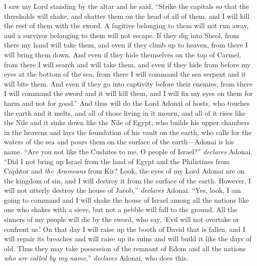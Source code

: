 \begin{biblechapter} %
 I saw my Lord standing by the altar and he said, “Strike the capitals so that the thresholds will shake, and shatter them on the head of all of them, and I will kill the rest of them with the sword. A fugitive belonging to them will not run away, and a survivor belonging to them will not escape.
\verse If they dig into Sheol, from there my hand will take them, and even if they climb up to heaven, from there I will bring them down.
\verse And even if they hide themselves on the top of Carmel, from there I will search and will take them, and even if they hide from before my eyes at the bottom of the sea, from there I will command the sea serpent and it will bite them.
\verse And even if they go into captivity before their enemies, from there I will command the sword and it will kill them, and I will fix my eyes on them for harm and not for good.”
\verse And thus will do the Lord Adonai of hosts, who touches the earth and it melts, and all of those living in it mourn, and all of it rises like the Nile and it sinks down like the Nile of Egypt,
\verse who builds his upper chambers in the heavens and lays the foundation of his vault on the earth, who calls for the waters of the sea and pours them on the surface of the earth—Adonai is his name.
\verse “Are you not like the Cushites to me, O people of Israel?” \textit{declares} Adonai. “Did I not bring up Israel from the land of Egypt and the Philistines from Caphtor and \textit{the Arameans} from Kir?
\verse Look, the eyes of my Lord Adonai are on the kingdom of sin, and I will destroy it from the surface of the earth. However, I will not utterly destroy the house of Jacob,” \textit{declares} Adonai.
\verse “Yes, look, I am going to command and I will shake the house of Israel among all the nations like one who shakes with a sieve, but not a pebble will fall to the ground.
\verse All the sinners of my people will die by the sword, who say, ‘Evil will not overtake or confront us.’
 On that day I will raise up the booth of David that is fallen, and I will repair its breaches and will raise up its ruins and will build it like the days of old.
\verse Thus they may take possession of the remnant of Edom and all the nations \textit{who are called by my name},” \textit{declares} Adonai, who does this.

\end{biblechapter}
